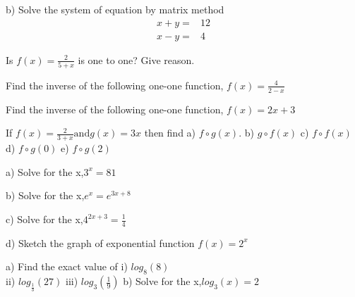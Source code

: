 \documentclass{exam}
\begin{document}
\begin{questions}
	\subitem b) Solve the system of equation by matrix method
	\hfill\enspace\hrulefill
	\begin{align}
	\nonumber
	x+y=&12 \\ 
	\nonumber
	x-y=&4   
	\end{align}
		
	
	\clearpage
	\question Is $f(x) =\frac{2}{5+x}$ is one to one? Give reason. 
	\hfill\enspace\hrulefill 
	\vspace{7cm}
	
	\question Find the inverse of the following one-one function, $f(x)=\frac{4}{2-x} $
	\hfill\enspace\hrulefill 
	\vspace{7cm}
	
	\question Find the inverse of the following one-one function, $f(x)=2x+3 $
	\hfill\enspace\hrulefill 
	
	
	
	\clearpage
	\question If $f(x) =\frac{2}{3+x} \mbox{and} g(x)=3x$ then find  
	\hfill\enspace\hrulefill
	\subitem a) $f\circ g(x)$. 
	\subitem b) $g\circ f(x)$
	\subitem c) $f\circ f(x)$
	\subitem d) $f\circ g(0)$
	\subitem e) $f\circ g(2)$
	\vspace{7cm}

		
\clearpage
		
	\question  
	\subitem a) Solve for the x,\quad \(3^{x}=81\) \hfill\enspace\hrulefill 
	\vspace{6cm}
	
	\subitem b) Solve for the x,\quad \(e^{x}=e^{3x+8}\) \hfill\enspace\hrulefill 
	\vspace{6cm}
	
	\subitem c) Solve for the x,\quad \( 4^{2x+3}=\frac{1}{4}\) \hfill\enspace\hrulefill 
	\vspace{6cm}
	
	\subitem d) Sketch the graph of exponential function $f(x)=2^x$ 
	\vspace{9cm}
	
	
	\question  
	\subitem a) Find the exact value of \subitem i) \(log_8(8)\)\\
	 \vspace{3cm}
   \subitem	ii) \(log_{\frac{1}{3}}(27)\)
	\vspace{3cm}
	\subitem	iii) \(log_3(\frac{1}{9})\)
	\vspace{3cm}
	\subitem b) Solve for the x,\quad \(log_3(x)=2\) \hfill\enspace\hrulefill 
	\vspace{6cm}
	

\end{questions}
\end{document}
